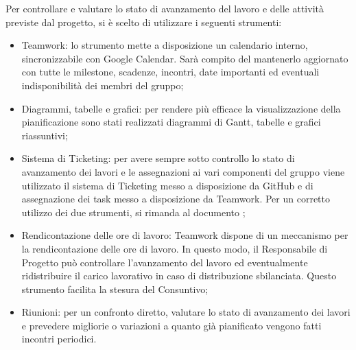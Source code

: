 \documentclass[../PianoProgetto.tex]{subfiles}
\begin{document}
Per controllare e valutare lo stato di avanzamento del lavoro e delle attività previste dal progetto, si è scelto di utilizzare i seguenti strumenti:
	\begin{itemize}
	\item Teamwork: lo strumento mette a disposizione un calendario interno, sincronizzabile con Google Calendar. Sarà compito del \responsabilediprogetto mantenerlo aggiornato con tutte le milestone, scadenze, incontri, date importanti ed eventuali indisponibilità dei membri del gruppo;
	\item Diagrammi, tabelle e grafici: per rendere più efficace la visualizzazione della pianificazione sono stati realizzati diagrammi di Gantt, tabelle e grafici riassuntivi;
	\item Sistema di Ticketing: per avere sempre sotto controllo lo stato di avanzamento dei lavori e le assegnazioni ai vari componenti del gruppo viene utilizzato il sistema di Ticketing messo a disposizione da GitHub e di assegnazione dei task messo a disposizione da Teamwork. Per un corretto utilizzo dei due strumenti, si rimanda al documento \normediprogetto;
	\item Rendicontazione delle ore di lavoro: Teamwork dispone di un meccanismo per la rendicontazione delle ore di lavoro. In questo modo, il Responsabile di Progetto può controllare l’avanzamento del lavoro ed eventualmente ridistribuire il carico lavorativo in caso di distribuzione sbilanciata. Questo strumento facilita la stesura del Consuntivo;
	\item Riunioni: per un confronto diretto, valutare lo stato di avanzamento dei lavori e prevedere migliorie o variazioni a quanto già pianificato vengono fatti incontri periodici.
	\end{itemize}
	
\end{document}
